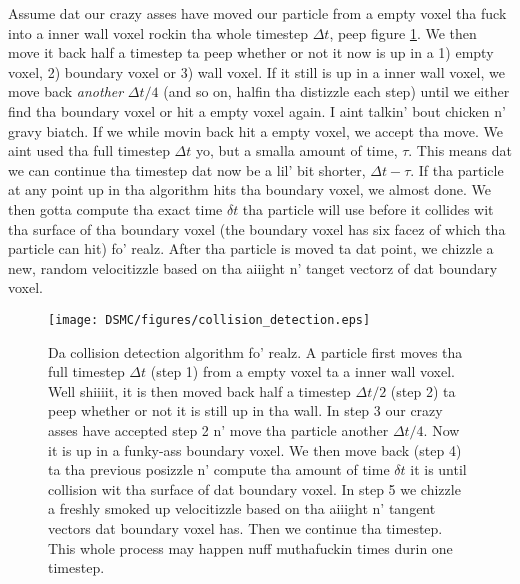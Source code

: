 Assume dat our crazy asses have moved our particle from a empty voxel tha fuck into a inner wall voxel rockin tha whole timestep $\Delta t$, peep figure \ref{fig:dsmc_collision_detection}. We then move it back half a timestep ta peep whether or not it now is up in a 1) empty voxel, 2) boundary voxel or 3) wall voxel. If it still is up in a inner wall voxel, we move back \textit{another} $\Delta t/4$ (and so on, halfin tha distizzle each step) until we either find tha boundary voxel or hit a empty voxel again. I aint talkin' bout chicken n' gravy biatch. If we while movin back hit a empty voxel, we accept tha move. We aint used tha full timestep $\Delta t$ yo, but a smalla amount of time, $\tau$. This means dat we can continue tha timestep dat now be a lil' bit shorter, $\Delta t - \tau$. If tha particle at any point up in tha algorithm hits tha boundary voxel, we almost done. We then gotta compute tha exact time $\delta t$ tha particle will use before it collides wit tha surface of tha boundary voxel (the boundary voxel has six facez of which tha particle can hit) fo' realz. After tha particle is moved ta dat point, we chizzle a new, random velocitizzle based on tha aiiight n' tanget vectorz of dat boundary voxel.
\newpage
\begin{figure}[htb]
\begin{center}
\texttt{[image: DSMC/figures/collision\_detection.eps]}
\end{center}
\caption{Da collision detection algorithm fo' realz. A particle first moves tha full timestep $\Delta t$ (step 1) from a empty voxel ta a inner wall voxel. Well shiiiit, it is then moved back half a timestep  $\Delta t/2$ (step 2) ta peep whether or not it is still up in tha wall. In step 3 our crazy asses have accepted step 2 n' move tha particle another $\Delta t/4$. Now it is up in a funky-ass boundary voxel. We then move back (step 4) ta tha previous posizzle n' compute tha amount of time $\delta t$ it is until collision wit tha surface of dat boundary voxel. In step 5 we chizzle a freshly smoked up velocitizzle based on tha aiiight n' tangent vectors dat boundary voxel has. Then we continue tha timestep. This whole process may happen nuff muthafuckin times durin one timestep.}
\label{fig:dsmc_collision_detection}
\end{figure}

